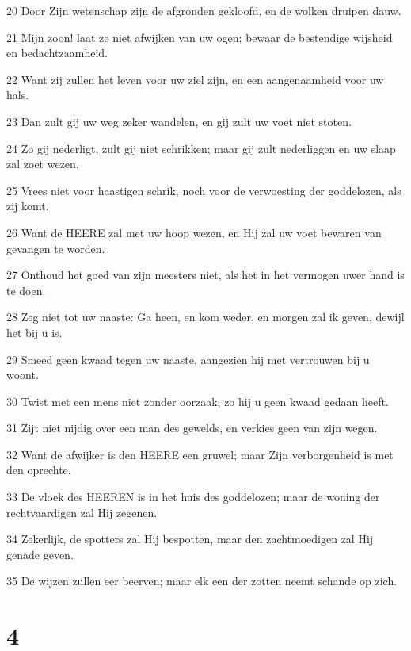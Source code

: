 \par 20 Door Zijn wetenschap zijn de afgronden gekloofd, en de wolken druipen dauw.
\par 21 Mijn zoon! laat ze niet afwijken van uw ogen; bewaar de bestendige wijsheid en bedachtzaamheid.
\par 22 Want zij zullen het leven voor uw ziel zijn, en een aangenaamheid voor uw hals.
\par 23 Dan zult gij uw weg zeker wandelen, en gij zult uw voet niet stoten.
\par 24 Zo gij nederligt, zult gij niet schrikken; maar gij zult nederliggen en uw slaap zal zoet wezen.
\par 25 Vrees niet voor haastigen schrik, noch voor de verwoesting der goddelozen, als zij komt.
\par 26 Want de HEERE zal met uw hoop wezen, en Hij zal uw voet bewaren van gevangen te worden.
\par 27 Onthoud het goed van zijn meesters niet, als het in het vermogen uwer hand is te doen.
\par 28 Zeg niet tot uw naaste: Ga heen, en kom weder, en morgen zal ik geven, dewijl het bij u is.
\par 29 Smeed geen kwaad tegen uw naaste, aangezien hij met vertrouwen bij u woont.
\par 30 Twist met een mens niet zonder oorzaak, zo hij u geen kwaad gedaan heeft.
\par 31 Zijt niet nijdig over een man des gewelds, en verkies geen van zijn wegen.
\par 32 Want de afwijker is den HEERE een gruwel; maar Zijn verborgenheid is met den oprechte.
\par 33 De vloek des HEEREN is in het huis des goddelozen; maar de woning der rechtvaardigen zal Hij zegenen.
\par 34 Zekerlijk, de spotters zal Hij bespotten, maar den zachtmoedigen zal Hij genade geven.
\par 35 De wijzen zullen eer beerven; maar elk een der zotten neemt schande op zich.

\chapter{4}

